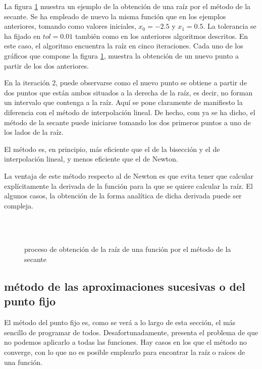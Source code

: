 La figura \ref{fig:secante3} muestra un ejemplo de la obtención de una raíz por el método de la secante. Se ha empleado de nuevo la misma función que en los ejemplos anteriores, tomando como valores iniciales, $x_0=-2.5$ y $x_1=0.5$. La tolerancia se ha fijado en $tol=0.01$ también como en los anteriores algoritmos descritos. En este caso, el algoritmo encuentra la raíz en cinco iteraciones. Cada uno de los gráficos que compone la figura \ref{fig:secante3}, muestra la obtención de un nuevo punto a partir de los dos anteriores. 

En la iteración 2, puede observarse como el nuevo punto se obtiene a partir de dos puntos que están ambos situados a la derecha de la raíz, es decir, no forman un intervalo que contenga a la raíz.  Aquí se pone claramente de manifiesto la diferencia con el método de interpolación lineal. De hecho, com ya se ha dicho, el método de la secante puede iniciarse tomando los dos primeros puntos a uno de los lados de la raíz.

 El método es, en principio, más eficiente que el de la bisección y el de interpolación lineal, y menos eficiente que el de Newton.

La ventaja de este método respecto al de Newton es que evita tener que calcular explícitamente la derivada de la función para la que se quiere calcular la raíz. El algunos casos, la obtención de la forma analítica de dicha derivada puede ser compleja.   

\begin{figure}
\centering
{} \qquad
{}\\
\qquad
{}\\
\qquad
{}

\caption{proceso de obtención de la raíz de una función por el método de la secante}
\label{fig:secante3}
\end{figure}

\subsection{método de las aproximaciones sucesivas o del punto fijo}

El método del punto fijo es, como se verá a lo largo de esta sección, el más sencillo de programar de todos. Desafortunadamente, presenta el problema de que no podemos aplicarlo a todas las funciones. Hay casos en los que el método no converge, con lo que no es posible emplearlo para encontrar la raíz o raíces de una función.
 
